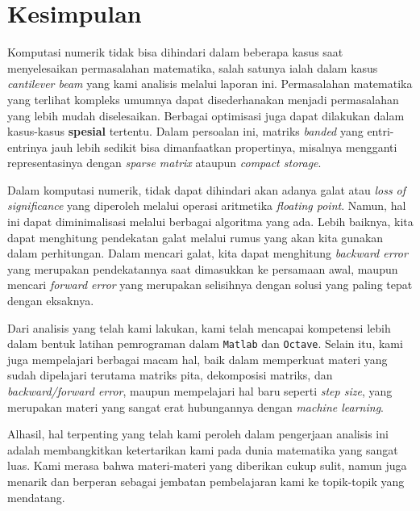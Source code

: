\documentclass[10pt, a4paper, onecolumn, oneside, final]{report}
\begin{document}
\section*{Kesimpulan}

Komputasi numerik tidak bisa dihindari dalam beberapa kasus saat menyelesaikan permasalahan matematika, salah satunya ialah dalam kasus \textit{cantilever beam} yang kami analisis melalui laporan ini. Permasalahan matematika yang terlihat kompleks umumnya dapat disederhanakan menjadi permasalahan yang lebih mudah diselesaikan. Berbagai optimisasi juga dapat dilakukan dalam kasus-kasus \textbf{spesial} tertentu. Dalam persoalan ini, matriks \textit{banded} yang entri-entrinya jauh lebih sedikit bisa dimanfaatkan propertinya, misalnya mengganti representasinya dengan \textit{sparse matrix} ataupun \textit{compact storage}.

Dalam komputasi numerik, tidak dapat dihindari akan adanya galat atau \textit{loss of significance} yang diperoleh melalui operasi aritmetika \textit{floating point}. Namun, hal ini dapat diminimalisasi melalui berbagai algoritma yang ada. Lebih baiknya, kita dapat menghitung pendekatan galat melalui rumus yang akan kita gunakan dalam perhitungan. Dalam mencari galat, kita dapat menghitung \textit{backward error} yang merupakan pendekatannya saat dimasukkan ke persamaan awal, maupun mencari \textit{forward error} yang merupakan selisihnya dengan solusi yang paling tepat dengan eksaknya.

Dari analisis yang telah kami lakukan, kami telah mencapai kompetensi lebih dalam bentuk latihan pemrograman dalam \texttt{Matlab} dan \texttt{Octave}. Selain itu, kami juga mempelajari berbagai macam hal, baik dalam memperkuat materi yang sudah dipelajari terutama matriks pita, dekomposisi matriks, dan \textit{backward/forward error}, maupun mempelajari hal baru seperti \textit{step size}, yang merupakan materi yang sangat erat hubungannya dengan \textit{machine learning}.

Alhasil, hal terpenting yang telah kami peroleh dalam pengerjaan analisis ini adalah membangkitkan ketertarikan kami pada dunia matematika yang sangat luas. Kami merasa bahwa materi-materi yang diberikan cukup sulit, namun juga menarik dan berperan sebagai jembatan pembelajaran kami ke topik-topik yang mendatang.

\nocite{*}


\end{document}
